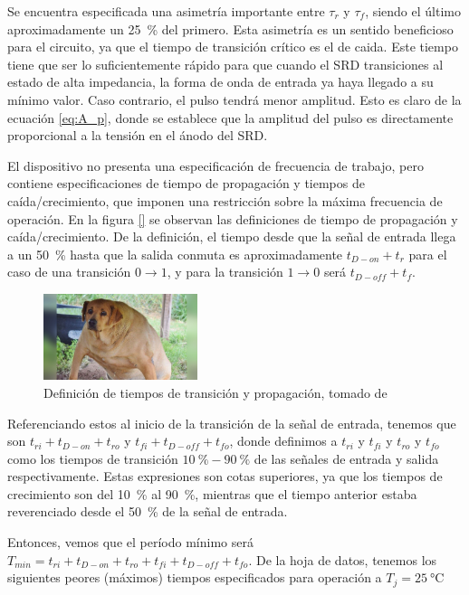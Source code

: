 Se encuentra especificada una asimetría importante entre $\tau_r$ y $\tau_f$,
siendo el último aproximadamente un \qty{25}{\percent} del primero. Esta
asimetría es un sentido beneficioso para el circuito, ya que el tiempo de
transición crítico es el de caida. Este tiempo tiene que ser lo suficientemente
rápido para que cuando el SRD transiciones al estado de alta impedancia, la forma
de onda de entrada ya haya llegado a su mínimo valor. Caso contrario, el pulso
tendrá menor amplitud. Esto es claro de la ecuación \ref{eq:A_p}, donde se
establece que la amplitud del pulso es directamente proporcional a la tensión en
el ánodo del SRD.

El dispositivo no presenta una especificación de frecuencia de trabajo, pero
contiene especificaciones de tiempo de propagación y tiempos de
caída/crecimiento, que imponen una restricción sobre la máxima frecuencia de
operación. En la figura \ref{} se observan las definiciones de tiempo de
propagación y caída/crecimiento. De la definición, el tiempo desde que la señal
de entrada llega a un \qty{50}{\percent} hasta que la salida conmuta es
aproximadamente $t_{D-on}+t_{r}$ para el caso de una transición $0\to1$, y
para la transición $1\to0$ será $t_{D-off}+t_{f}$.

\begin{figure}[tbp]
    \centering
    \includegraphics[width=0.4\textwidth]{images/placeholder.jpg}
    \caption{Definición de tiempos de transición y propagación, tomado de
    \cite{LM5114_datasheet}}
    \label{fig:lm5114_timing}
\end{figure}

Referenciando estos al inicio de la transición de la señal de entrada, tenemos
que son $t_{ri}+t_{D-on}+t_{ro}$ y $t_{fi}+t_{D-off}+t_{fo}$, donde definimos a
$t_{ri}$ y $t_{fi}$ y $t_{ro}$ y $t_{fo}$ como los tiempos de transición
$\qty{10}{\percent}-\qty{90}{\percent}$ de las señales de entrada y salida
respectivamente. Estas expresiones son cotas superiores, ya que los tiempos de
crecimiento son del \qty{10}{\percent} al \qty{90}{\percent}, mientras que el
tiempo anterior estaba reverenciado desde el \qty{50}{\percent} de la señal de
entrada.

Entonces, vemos que el período mínimo será $T_{min} = t_{ri} + t_{D-on} + t_{ro}
+ t_{fi} + t_{D-off} + t_{fo}$. De la hoja de datos, tenemos los siguientes
peores (máximos) tiempos especificados para operación a $T_j=\qty{25}{\celsius}$


